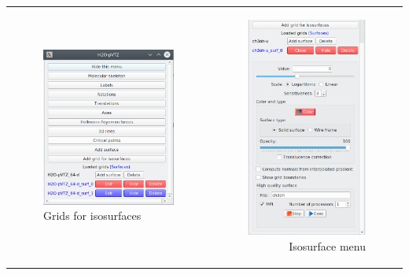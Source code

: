 \documentclass[10pt]{article}
\begin{document}
\hspace*{-5mm}
\begin{center}
\begin{tabular}{lr}
\begin{minipage}{.4\linewidth}
    \begin{figure}[H]
        \begin{center}
            \includegraphics[width=0.5\linewidth]{damqt320_grid_menu.png}
        \end{center}
        \vspace*{5.5mm}
        \caption{Grids for isosurfaces \label{fig:4_13_10_1}}
    \end{figure}
\end{minipage}
&
\begin{minipage}{.4\linewidth}
    \begin{figure}[H]
        \begin{center}
            \includegraphics[width=0.5\linewidth]{damqt320_isosurface_menu.png} 
        \end{center}
        \vspace*{-0.5mm}
        \caption{Isosurface menu \label{fig:4_13_10_2}}
    \end{figure}
\end{minipage}
\end{tabular} 
\end{center}
\end{document}
